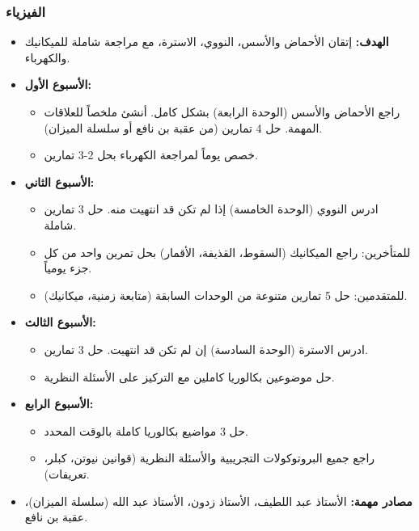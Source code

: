 \documentclass[12pt,a4paper]{book}
\begin{document}
	\subsubsection*{الفيزياء}
	\begin{itemize}
		\item \textbf{الهدف:} إتقان الأحماض والأسس، النووي، الاسترة، مع مراجعة شاملة للميكانيك والكهرباء.
		\item \textbf{الأسبوع الأول:}
		\begin{itemize}
			\item راجع الأحماض والأسس (الوحدة الرابعة) بشكل كامل. أنشئ ملخصاً للعلاقات المهمة. حل 4 تمارين (من عقبة بن نافع أو سلسلة الميزان).
			\item خصص يوماً لمراجعة الكهرباء  بحل 2-3 تمارين.
		\end{itemize}
		\item \textbf{الأسبوع الثاني:}
		\begin{itemize}
			\item ادرس النووي (الوحدة الخامسة) إذا لم تكن قد انتهيت منه. حل 3 تمارين شاملة.
			\item للمتأخرين: راجع الميكانيك (السقوط، القذيفة، الأقمار) بحل تمرين واحد من كل جزء يومياً.
			\item للمتقدمين: حل 5 تمارين متنوعة من الوحدات السابقة (متابعة زمنية، ميكانيك).
		\end{itemize}
		\item \textbf{الأسبوع الثالث:}
		\begin{itemize}
			\item ادرس الاسترة (الوحدة السادسة) إن لم تكن قد انتهيت. حل 3 تمارين.
			\item حل موضوعين بكالوريا كاملين مع التركيز على الأسئلة النظرية.
		\end{itemize}
		\item \textbf{الأسبوع الرابع:}
		\begin{itemize}
			\item حل 3 مواضيع بكالوريا كاملة بالوقت المحدد.
			\item راجع جميع البروتوكولات التجريبية والأسئلة النظرية (قوانين نيوتن، كبلر، تعريفات).
		\end{itemize}
		\item \textbf{مصادر مهمة:} الأستاذ عبد اللطيف، الأستاذ زدون، الأستاذ عبد الله (سلسلة الميزان)، عقبة بن نافع.
	\end{itemize}
	
\end{document}

